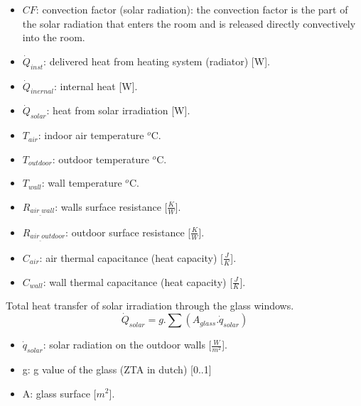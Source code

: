  \begin{itemize}
      \item $CF$: convection factor (solar radiation): the convection factor is the part of the solar radiation that enters the room and is released directly convectively into the room.
      \item $\dot{Q}_{inst}$: delivered heat from heating system (radiator) [W].
      \item $\dot{Q}_{inernal}$: internal heat [W].
      \item $\dot{Q}_{solar}$: heat from solar irradiation [W].
      \item $T_{air}$: indoor air temperature $^o$C.
      \item $T_{outdoor}$: outdoor temperature $^o$C.
      \item $T_{wall}$: wall temperature $^o$C.
      \item $R_{air_{\_}wall}$: walls surface resistance [$\frac{K}{W}$].
      \item $R_{air_{\_}outdoor}$: outdoor surface resistance [$\frac{K}{W}$].
      \item $C_{air}$: air thermal capacitance (heat capacity) [$\frac{J}{K}$]\cite{Thermalmass}.
      \item $C_{wall}$: wall thermal capacitance (heat capacity) [$\frac{J}{K}$]\cite{Thermalmass}.
    \end{itemize}

\newpage   

Total heat transfer of solar irradiation through the glass windows. 
\begin{equation}
\dot{Q}_{solar}=g.\sum(A_{glass}.\dot{q}_{solar})
\end{equation}

\begin{itemize}
    \item $\dot{q}_{solar}$: solar radiation on the outdoor walls [$\frac{W}{m^2}$]. 
    \item g: g value of the glass (ZTA in dutch) [0..1]\cite{zontoetreding}
    \item A: glass surface [$m^2$].
\end{itemize}



\newpage
